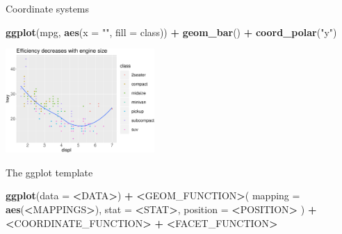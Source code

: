 \documentclass[ignorenonframetext,]{beamer}
\newenvironment{Shaded}{\begin{snugshade}}{\end{snugshade}}
\newcommand{\DataTypeTok}[1]{\textcolor[rgb]{0.13,0.29,0.53}{#1}}
\newcommand{\ErrorTok}[1]{\textcolor[rgb]{0.64,0.00,0.00}{\textbf{#1}}}
\newcommand{\KeywordTok}[1]{\textcolor[rgb]{0.13,0.29,0.53}{\textbf{#1}}}
\newcommand{\NormalTok}[1]{#1}
\newcommand{\OperatorTok}[1]{\textcolor[rgb]{0.81,0.36,0.00}{\textbf{#1}}}
\newcommand{\StringTok}[1]{\textcolor[rgb]{0.31,0.60,0.02}{#1}}
\begin{document}
\begin{frame}[fragile]{Coordinate systems}
\protect\hypertarget{coordinate-systems-3}{}

\begin{Shaded}
\begin{Highlighting}[]
\KeywordTok{ggplot}\NormalTok{(mpg, }\KeywordTok{aes}\NormalTok{(}\DataTypeTok{x =} \StringTok{""}\NormalTok{, }\DataTypeTok{fill =}\NormalTok{ class)) }\OperatorTok{+}
\StringTok{  }\KeywordTok{geom_bar}\NormalTok{() }\OperatorTok{+}
\StringTok{  }\KeywordTok{coord_polar}\NormalTok{(}\StringTok{"y"}\NormalTok{)}
\end{Highlighting}
\end{Shaded}

\begin{center}\includegraphics[height=150px]{data-visualization_files/figure-beamer/unnamed-chunk-148-1} \end{center}

\end{frame}

\begin{frame}[fragile]{The ggplot template}
\protect\hypertarget{the-ggplot-template}{}

\begin{Shaded}
\begin{Highlighting}[]
\KeywordTok{ggplot}\NormalTok{(}\DataTypeTok{data =} \OperatorTok{<}\NormalTok{DATA}\OperatorTok{>}\NormalTok{) }\OperatorTok{+}\StringTok{ }
\StringTok{  }\ErrorTok{<}\NormalTok{GEOM_FUNCTION}\OperatorTok{>}\NormalTok{(}
     \DataTypeTok{mapping =} \KeywordTok{aes}\NormalTok{(}\OperatorTok{<}\NormalTok{MAPPINGS}\OperatorTok{>}\NormalTok{),}
     \DataTypeTok{stat =} \OperatorTok{<}\NormalTok{STAT}\OperatorTok{>}\NormalTok{, }
     \DataTypeTok{position =} \OperatorTok{<}\NormalTok{POSITION}\OperatorTok{>}
\StringTok{  }\NormalTok{) }\OperatorTok{+}
\StringTok{  }\ErrorTok{<}\NormalTok{COORDINATE_FUNCTION}\OperatorTok{>}\StringTok{ }\OperatorTok{+}
\StringTok{  }\ErrorTok{<}\NormalTok{FACET_FUNCTION}\OperatorTok{>}
\end{Highlighting}
\end{Shaded}

\end{frame}
\end{document}
